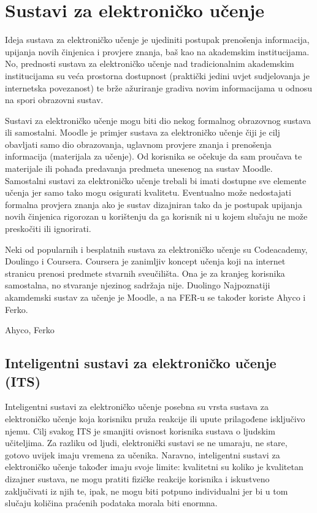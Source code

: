 \documentclass[times, utf8, zavrsni]{fer}
\begin{document}
\chapter{Sustavi za elektroničko učenje}
Ideja sustava za elektroničko učenje je ujediniti postupak prenošenja informacija, upijanja novih činjenica i provjere znanja, baš kao na akademskim institucijama. No, prednosti sustava za elektroničko učenje nad tradicionalnim akademskim institucijama su veća prostorna dostupnost (praktički jedini uvjet sudjelovanja je internetska povezanost) te brže ažuriranje gradiva novim informacijama u odnosu na spori obrazovni sustav.
\par
Sustavi za elektroničko učenje mogu biti dio nekog formalnog obrazovnog sustava ili samostalni. Moodle je primjer sustava za elektroničko učenje čiji je cilj obavljati samo dio obrazovanja, uglavnom provjere znanja i prenošenja informacija (materijala za učenje). Od korisnika se očekuje da sam proučava te materijale ili pohađa predavanja predmeta unesenog na sustav Moodle. Samostalni sustavi za elektroničko učenje trebali bi imati dostupne sve elemente učenja jer samo tako mogu osigurati kvalitetu. Eventualno može nedostajati formalna provjera znanja ako je sustav dizajniran tako da je postupak upijanja novih činjenica rigorozan u korištenju da ga korisnik ni u kojem slučaju ne može preskočiti ili ignorirati. 
\par
Neki od popularnih i besplatnih sustava za elektroničko učenje su Codeacademy, Doulingo i Coursera. Coursera je zanimljiv koncept učenja koji na internet stranicu prenosi predmete stvarnih sveučilišta. Ona je za kranjeg korisnika samostalna, no stvaranje njezinog sadržaja nije. Duolingo Najpoznatiji akamdemski sustav za učenje je Moodle, a na FER-u se također koriste Ahyco i Ferko.
\par
Ahyco, Ferko
\pagebreak
\section{Inteligentni sustavi za elektroničko učenje (ITS)}
Inteligentni sustavi za elektroničko učenje posebna su vrsta sustava za elektroničko učenje koja korisniku pruža reakcije ili upute prilagođene isključivo njemu. Cilj svakog ITS je smanjiti ovisnost korisnika sustava o ljudskim učiteljima. Za razliku od ljudi, elektronički sustavi se ne umaraju, ne stare, gotovo uvijek imaju vremena za učenika. Naravno, inteligentni sustavi za elektroničko učenje također imaju svoje limite: kvalitetni su koliko je kvalitetan dizajner sustava, ne mogu pratiti fizičke reakcije korisnika i iskustveno zaključivati iz njih te, ipak, ne mogu biti potpuno individualni jer bi u tom slučaju količina praćenih podataka morala biti enormna. 
\end{document}
